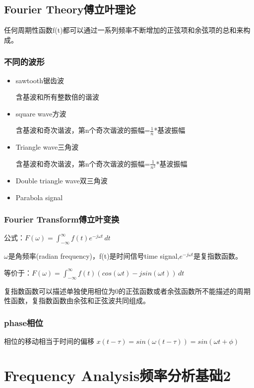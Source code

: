 \documentclass[UTF8]{ctexart}
\begin{document}
\subsection{Fourier Theory傅立叶理论}

任何周期性函数f(t)都可以通过一系列频率不断增加的正弦项和余弦项的总和来构成。

\subsubsection{不同的波形}
\begin{itemize}
    \item sawtooth锯齿波
    
    含基波和所有整数倍的谐波
    \item square wave方波
    
    含基波和奇次谐波，第n个奇次谐波的振幅=$\frac{1}{n}$*基波振幅
    \item Triangle wave三角波
    
    含基波和奇次谐波，第n个奇次谐波的振幅=$\frac{1}{n^2}$*基波振幅
    \item Double triangle wave双三角波
    \item Parabola signal
\end{itemize}

\subsubsection{Fourier Transform傅立叶变换}

公式：$F(\omega)=\int_{-\infty }^{\infty} f(t)e^{-j\omega t} \,dt $

$\omega$是角频率(radian frequency)，f(t)是时间信号time signal,$e^{-j\omega t}$是复指数函数。

等价于：$F(\omega)=\int_{-\infty }^{\infty} f(t)(cos(\omega t)-jsin(\omega t)) \,dt $

复指数函数可以描述单独使用相位为0的正弦函数或者余弦函数所不能描述的周期性函数，复指数函数由余弦和正弦波共同组成。

\subsubsection{phase相位}
相位的移动相当于时间的偏移
$x(t-\tau )=sin(\omega(t-\tau))=sin(\omega t+\phi )$

\section{Frequency Analysis频率分析基础2}
\end{document}
